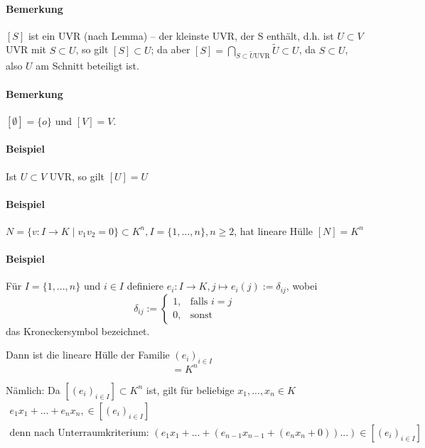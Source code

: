 \paragraph{Bemerkung}
    $[S]$ ist ein UVR (nach Lemma) -- der \glqq kleinste\grqq{} UVR, der S enthält, d.h. ist $U\subset V$ UVR mit $S\subset U$, so gilt $[S]\subset U$; da aber $[S] = \bigcap_{S\subset \tilde{U}  \text{UVR}}\tilde{U}\subset U$,
    da $S\subset U$, also $U$ am Schnitt beteiligt ist.
    
\paragraph{Bemerkung}
	$[\emptyset ] = \{o\}$ und $[V] = V$.
	
\paragraph{Beispiel}
	Ist $U\subset V$ UVR, so gilt $[U] = U$
	
\paragraph{Beispiel}
	$N=\{v:I\to K\mid v_1v_2=0\} \subset K^n,I=\{1,...,n\},n\geq 2$, hat lineare Hülle $[N]=K^n$
	
\paragraph{Beispiel}
	Für $I=\{1,...,n\}$ und $i\in I$ definiere
	$e_i:I\to K , j\mapsto e_i(j):= \delta_{ij}$, wobei 
	\begin{equation*}
		\delta_{ij} :=
		\begin{cases}
			1,& \text{falls }i=j\\
			0,& \text{sonst}
		\end{cases}
	\end{equation*}
	das Kroneckersymbol bezeichnet.
	
	Dann ist die lineare Hülle der Familie $(e_i)_{i\in I}$
	\begin{equation*}
		[(e_i)_{i\in I}] = K^n
	\end{equation*}
	
	Nämlich: Da $[(e_i)_{i\in I}]\subset K^n$ ist, gilt für beliebige $x_1,...,x_n\in K$
	\begin{gather*}
		e_1x_1+...+e_nx_n,\in [(e_i)_{i\in I}]\\ \text{denn nach Unterraumkriterium: } (e_1x_1+...+(e_{n-1}x_{n-1}+(e_nx_n + 0))...) \in [(e_i)_{i\in I}]
	\end{gather*}
	
